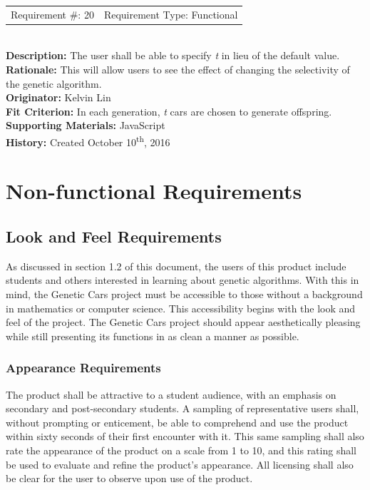 \documentclass[12pt, titlepage]{article}
\begin{document}
\begin{reqbox}
%
\begin{tabular}{cc}
Requirement \#: 20 & Requirement Type: Functional \\
\end{tabular} \\
%
\textbf{Description:} The user shall be able to specify \textit{t} in lieu of 
the default value. \\
\textbf{Rationale:} This will allow users to see the effect of changing the 
selectivity of the genetic algorithm. \\
\textbf{Originator:} Kelvin Lin\\
\textbf{Fit Criterion:} In each generation, \textit{t} cars are chosen to 
generate offspring. \\
%  
\textbf{Supporting Materials:} JavaScript \\
\textbf{History:} Created October 10\textsuperscript{th}, 2016
%
\end{reqbox}

\newpage


\section{Non-functional Requirements}

\subsection{Look and Feel Requirements}

As discussed in section 1.2 of this document, the users of this product include 
students and others interested in learning about genetic algorithms. With this 
in mind, the Genetic Cars project must be accessible to those without a 
background in mathematics or computer science. This accessibility begins with 
the look and feel of the project. The Genetic Cars project should appear 
aesthetically pleasing while still presenting its functions in as clean a manner 
as possible.

\subsubsection{Appearance Requirements}

The product shall be attractive to a student audience, with an emphasis on 
secondary and post-secondary students. A sampling of representative users shall, 
without prompting or enticement, be able to comprehend and use the product 
within sixty seconds of their first encounter with it. This same sampling shall 
also rate the appearance of the product on a scale from 1 to 10, and this rating 
shall be used to evaluate and refine the product's appearance. All licensing 
shall also be clear for the user to observe upon use of the product.
\end{document}
